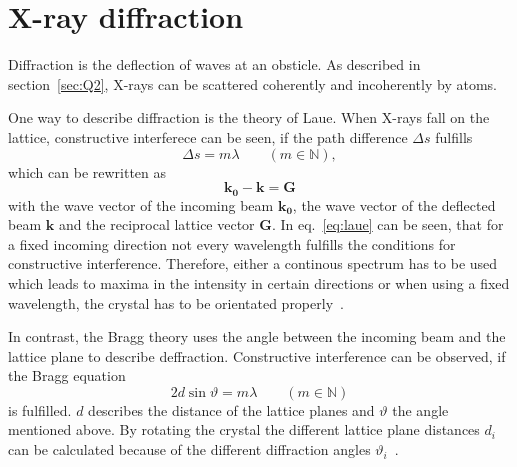  
\section{X-ray diffraction}\label{sec:Q5}

Diffraction is the deflection of waves at an obsticle. As described in section~\ref{sec:Q2}, X-rays can be scattered coherently and incoherently by atoms. \par 
One way to describe diffraction is the theory of Laue. When X-rays fall on the lattice, constructive interferece can be seen, if the path difference $\Delta s$ fulfills 
\begin{equation}
    \Delta s = m\lambda \qquad (m \in \mathbb{N}),
\end{equation}
which can be rewritten as 
\begin{equation}
    \mathbf{k_0} - \mathbf{k} = \mathbf{G}
    \label{eq:laue}
\end{equation}
with the wave vector of the incoming beam $\mathbf{k_0}$, the wave vector of the deflected beam $\mathbf{k}$ and the reciprocal lattice vector $\mathbf{G}$. In eq.~\ref{eq:laue} can be seen, that for a fixed incoming direction not every wavelength fulfills the conditions for constructive interference. Therefore, either a continous spectrum has to be used which leads to maxima in the intensity in certain directions or when using a fixed wavelength, the crystal has to be orientated properly~\cite{Demtroeder.2016}. \par 
In contrast, the Bragg theory uses the angle between the incoming beam and the lattice plane to describe deffraction. Constructive interference can be observed, if the Bragg equation 
\begin{equation}
    2d\sin\vartheta = m\lambda \qquad (m \in \mathbb{N})
\end{equation}
is fulfilled. $d$ describes the distance of the lattice planes and $\vartheta$ the angle mentioned above. By rotating the crystal the different lattice plane distances $d_i$ can be calculated because of the different diffraction angles $\vartheta_i$~\cite{Demtroeder.2016}.
